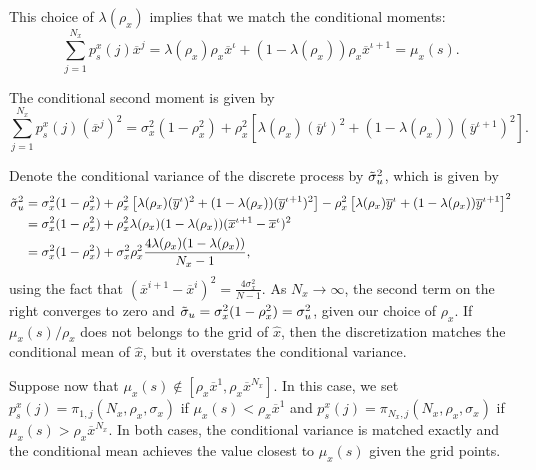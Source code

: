 This choice of $\lambda(\rho_x)$ implies that we match the conditional moments:
\begin{equation}
     \sum_{j=1}^{N_x} p_{s}^x(j)\overline{x}^{j}  = \lambda(\rho_x) \rho_x \overline{x}^{\iota} + (1-\lambda(\rho_x)) \rho_x \overline{x}^{\iota+1} = \mu_{x}(s).
\end{equation}

The conditional second moment is given by
\begin{equation}
     \sum_{j=1}^{N_x} p_s^x(j) (\overline{x}^{j})^2 = \sigma_x^2 (1-\rho_x^2) + \rho_x^2 \left[\lambda(\rho_x) (\overline{y}^{\iota})^2 + (1-\lambda(\rho_x)) (\overline{y}^{\iota+1})^2\right].
\end{equation}

Denote the conditional variance of the discrete process by $\Tilde{\sigma}_u^2$, which is given by 
\begin{align}
    \Tilde{\sigma}_u^2 &=  \sigma_x^2 (1-\rho_x^2) + \rho_x^2 \left[\lambda(\rho_x) (\overline{y}^{\iota})^2 + (1-\lambda(\rho_x)) (\overline{y}^{\iota+1})^2\right]  - \rho_x^2 \left[\lambda(\rho_x) \overline{y}^{\iota} + (1-\lambda(\rho_x)) \overline{y}^{\iota+1}\right]^2 \nonumber\\
    &= \sigma_x^2 (1-\rho_x^2) + \rho_x^2 \lambda(\rho_x) (1-\lambda(\rho_x)) ( \overline{x}^{\iota+1} - \overline{x}^{\iota} )^2\nonumber\\
    &= \sigma_x^2 (1-\rho_x^2) + \sigma_x^2 \rho_x^2 \frac{4\lambda(\rho_x) (1-\lambda(\rho_x)) }{N_x-1},
\end{align}
using the fact that $(\overline{x}^{i+1} - \overline{x}^{i})^2 = \frac{4 \sigma_x^2}{N-1}$.
As $N_x \rightarrow \infty$, the second term on the right converges to zero and $\Tilde{\sigma}_u = \sigma_x^2 (1-\rho_x^2) = \sigma_u^2$, given our choice of $\rho_x$. If $\mu_{x}(s)/\rho_x$ does not belongs to the grid of $\hat{x}$, then the discretization matches the conditional mean of $\hat{x}$, but it overstates the conditional variance.  

Suppose now that $\mu_x(s) \notin [\rho_x \overline{x}^1, \rho_x \overline{x}^{N_x}]$. In this case, we set $p_s^x(j) = \pi_{1,j}(N_x, \rho_x, \sigma_x)$ if $\mu_{x}(s) < \rho_x \overline{x}^1$ and $p_s^x(j) = \pi_{N_x,j}(N_x, \rho_x   , \sigma_x)$ if $\mu_x(s) > \rho_x \overline{x}^{N_x}$. In both cases, the conditional variance is matched exactly and the conditional mean achieves the value closest to $\mu_{x}(s)$ given the grid points. 

